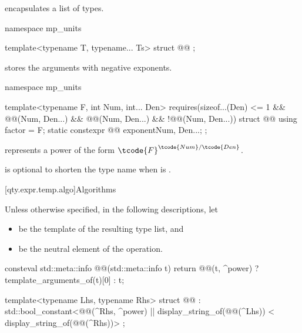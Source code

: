 \pnum
{} encapsulates a list of types.

\begin{codeblock}
namespace mp_units {

template<typename T, typename... Ts>
struct @@ {};

}
\end{codeblock}

\pnum
{} stores the arguments with negative exponents.

\begin{codeblock}
namespace mp_units {

template<typename F, int Num, int... Den>
  requires(sizeof...(Den) <= 1 && @@(Num, Den...) && @@(Num, Den...) &&
           !@@(Num, Den...))
struct @@ {
  using factor = F;
  static constexpr @@ exponent{Num, Den...};
};

}
\end{codeblock}

\pnum
{} represents a power
of the form $\tcode{F}^{\tcode{Num}/\tcode{Den}}$.
\begin{note}
 is optional to shorten the type name when  is .
\end{note}

[qty.expr.temp.algo]{Algorithms}

\pnum
Unless otherwise specified, in the following descriptions, let
\begin{itemize}
\item
{} be the template of the resulting type list, and
\item
{} be the neutral element of the operation.
\end{itemize}

\begin{codeblock}
consteval std::meta::info @@(std::meta::info t)
{
  return @@(t, ^power) ? template_arguments_of(t)[0] : t;
}

template<typename Lhs, typename Rhs>
struct @@ :
    std::bool_constant<@@(^Rhs, ^power) ||
                       display_string_of(@@(^Lhs)) <
                         display_string_of(@@(^Rhs))> {
};
\end{codeblock}


